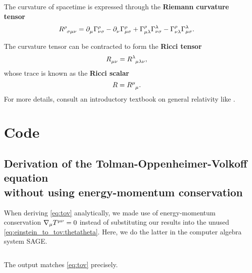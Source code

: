 The curvature of spacetime is expressed through the \textbf{Riemann curvature tensor}
\begin{equation}
	R\indices{^\rho_\sigma_\mu_\nu} =
	\partial\indices{_\mu} \Gamma^\rho_{\nu \sigma} -
	\partial\indices{_\nu} \Gamma^{\rho}_{\mu \sigma} +
	\Gamma^\rho_{\mu \lambda} \Gamma^{\lambda}_{\nu \sigma} -
	\Gamma^\rho_{\nu \lambda} \Gamma^{\lambda}_{\mu \sigma} .
	\label{eq:def_riemann_tensor}
\end{equation}

The curvature tensor can be contracted to form the \textbf{Ricci tensor}
\begin{equation}
	R\indices{_\mu_\nu} = R\indices{^\lambda_\mu_\lambda_\nu},
	\label{eq:def_ricci_tensor}
\end{equation}
whose trace is known as the \textbf{Ricci scalar}
\begin{equation}
	R = R\indices{^\mu_\mu} .
	\label{eq:def_ricci_scalar}
\end{equation}
For more details, consult an introductory textbook on general relativity like \cite{ref:carroll}.

\chapter{Code}

\section{Derivation of the Tolman-Oppenheimer-Volkoff equation \texorpdfstring{\\}{} without using energy-momentum conservation}
\label{sec:tov_cas_derivation}

When deriving \cref{eq:tov} analytically, we made use of energy-momentum conservation $\nabla_\mu T\indices{^\mu^\nu} = 0$ instead of substituting our results into the unused \cref{eq:einstein_to_tov:thetatheta}.
Here, we do the latter in the computer algebra system SAGE.

\inputminted{python}{../code/einstein_to_tov/ein.sage}

The output matches \cref{eq:tov} precisely.
